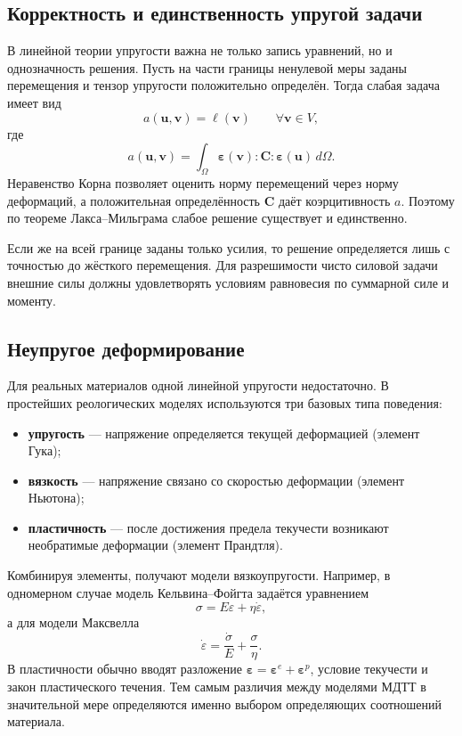 \subsection{Корректность и единственность упругой задачи}

В линейной теории упругости важна не только запись уравнений, но и
однозначность решения. Пусть на части границы ненулевой меры заданы
перемещения и тензор упругости положительно определён. Тогда слабая задача
имеет вид
\[
a(\mathbf u,\mathbf v)=\ell(\mathbf v)
\qquad \forall\mathbf v\in V,
\]
где
\[
a(\mathbf u,\mathbf v)
=\int_\Omega
\boldsymbol\varepsilon(\mathbf v):\mathbf C:
\boldsymbol\varepsilon(\mathbf u)\,d\Omega.
\]
Неравенство Корна позволяет оценить норму перемещений через норму деформаций,
а положительная определённость $\mathbf C$ даёт коэрцитивность $a$. Поэтому
по теореме Лакса--Мильграма слабое решение существует и единственно.

Если же на всей границе заданы только усилия, то решение определяется лишь с
точностью до жёсткого перемещения. Для разрешимости чисто силовой задачи
внешние силы должны удовлетворять условиям равновесия по суммарной силе и
моменту.

\subsection{Неупругое деформирование}

Для реальных материалов одной линейной упругости недостаточно. В простейших
реологических моделях используются три базовых типа поведения:
\begin{itemize}
    \item \textbf{упругость} --- напряжение определяется текущей деформацией
    (элемент Гука);
    \item \textbf{вязкость} --- напряжение связано со скоростью деформации
    (элемент Ньютона);
    \item \textbf{пластичность} --- после достижения предела текучести возникают
    необратимые деформации (элемент Прандтля).
\end{itemize}
Комбинируя элементы, получают модели вязкоупругости. Например, в одномерном
случае модель Кельвина--Фойгта задаётся уравнением
\[
    \sigma=E\varepsilon+\eta\dot\varepsilon,
\]
а для модели Максвелла
\[
    \dot\varepsilon=\frac{\dot\sigma}{E}+\frac{\sigma}{\eta}.
\]
В пластичности обычно вводят разложение
$\boldsymbol\varepsilon=\boldsymbol\varepsilon^e+
\boldsymbol\varepsilon^p$, условие текучести и закон пластического течения.
Тем самым различия между моделями МДТТ в значительной мере определяются именно
выбором определяющих соотношений материала.

